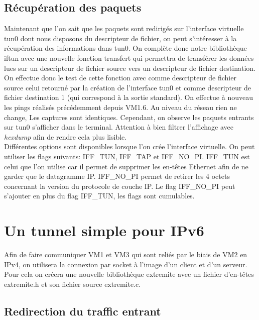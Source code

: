 \documentclass[a4paper, 12pt]{article}
\begin{document}
    \subsection{Récupération des paquets}
    Maintenant que l'on sait que les paquets sont redirigés sur l'interface
    virtuelle tun0 dont nous disposons du descripteur de fichier, on peut 
    s'intéresser à la récupération des informations dans tun0. On complète
    donc notre bibliothèque iftun avec une nouvelle fonction transfert qui
    permettra de transférer les données lues sur un descripteur de fichier
    source vers un descripteur de fichier destination. \\

    On effectue donc le test de cette fonction avec comme descripteur de 
    fichier source celui retourné par la création de l'interface tun0 et
    comme descripteur de fichier destination 1 (qui correspond à la 
    sortie standard). On effectue à nouveau les pings réalisés précédemment
    depuis VM1.6. Au niveau du réseau rien ne change, Les captures sont 
    identiques. Cependant, on observe les paquets entrants sur tun0 s'afficher
    dans le terminal. Attention à bien filtrer l'affichage avec 
    \textit{hexdump} afin de rendre cela plus lisible. \\

    Différentes options sont disponibles lorsque l'on crée l'interface 
    virtuelle. On peut utiliser les flags suivants: IFF\_TUN, IFF\_TAP et
    IFF\_NO\_PI. IFF\_TUN est celui que l'on utilise car il permet de 
    supprimer les en-têtes Ethernet afin de ne garder que le datagramme IP.
    IFF\_NO\_PI permet de retirer les 4 octets concernant la version du 
    protocole de couche IP. Le flag IFF\_NO\_PI peut s'ajouter en plus du 
    flag IFF\_TUN, les flags sont cumulables.

    \section{Un tunnel simple pour IPv6}

    Afin de faire communiquer VM1 et VM3 qui sont reliés par le biais de VM2
    en IPv4, on utilisera la connexion par socket à l'image d'un client et 
    d'un serveur. Pour cela on créera une nouvelle bibliothèque extremite avec
    un fichier d'en-têtes extremite.h et son fichier source extremite.c.

    \subsection{Redirection du traffic entrant}
\end{document}
